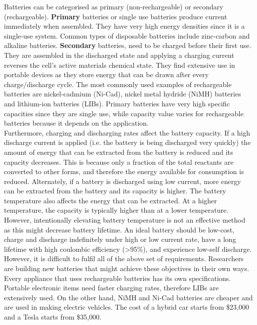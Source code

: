 Batteries can be categorised as primary (non-rechargeable) or secondary (rechargeable). \textbf{Primary} batteries or single use batteries produce current immediately when assembled. They have very high energy densities since it is a single-use system. Common types of disposable batteries include zinc-carbon and alkaline batteries. 
\textbf{Secondary} batteries, need to be charged before their first use. They are assembled in the discharged state and applying a charging current reverses the cell's active materials chemical state. They find extensive use in portable devices as they store energy that can be drawn after every charge/discharge cycle. The most commonly used examples of rechargeable batteries are nickel-cadmium (Ni-Cad), nickel metal hydride (NiMH) batteries and lithium-ion batteries (LIBs). Primary batteries have very high specific capacities since they are single use, while capacity value varies for rechargeable batteries because it depends on the application.\\  
Furthermore, charging and discharging rates affect the battery capacity. If a high discharge current is applied (i.e. the battery is being discharged very quickly) the amount of energy that can be extracted from the battery is reduced and its capacity decreases. This is because only a fraction of the total reactants are converted to other forms, and therefore the energy available for consumption is reduced. Alternately, if a battery is discharged using low current, more energy can be extracted from the battery and its capacity is higher. The battery temperature also affects the energy that can be extracted. At a higher temperature, the capacity is typically higher than at a lower temperature. However, intentionally elevating battery temperature is not an effective method as this might decrease battery lifetime\cite{leng_effect_2015, ma_temperature_2018}. 
An ideal battery should be low-cost, charge and discharge indefinitely under high or low current rate, have a long lifetime with high coulombic efficiency (>95\%), and experience low-self discharge. However, it is difficult to fulfil all of the above set of requirements. Researchers are building new batteries that might achieve these objectives in their own ways\cite{slater_sodium-ion_2013,jian_carbon_2015,aurbach_prototype_2000,lin_ultrafast_2015-2}. Every appliance that uses rechargeable batteries has its own specifications. Portable electronic items need faster charging rates, therefore LIBs are extensively used. On the other hand, NiMH and Ni-Cad batteries are cheaper and are used in making electric vehicles. The cost of a hybrid car starts from \$23,000 and a Tesla starts from \$35,000. \\


